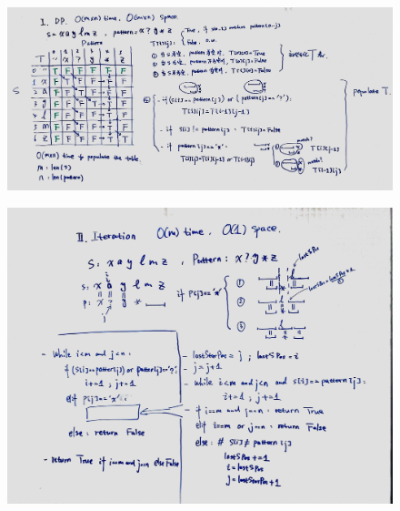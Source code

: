 \documentclass[a4paper,10pt]{article}
\begin{document}
\begin{figure}[h]
    \includegraphics[width=\textwidth]{leetcode44-1.jpg}
    \centering
\end{figure}

\begin{figure}[h]
    \includegraphics[width=\textwidth]{leetcode44-2.jpg}
    \centering\\
\end{figure}
\end{document}
